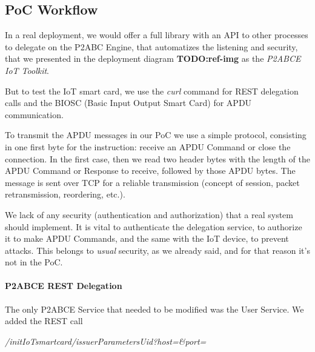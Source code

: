 \subsection{PoC Workflow}





In a real deployment, we would offer a full library with an API to other processes to delegate on the P2ABC Engine, that automatizes the listening and security, that we presented in the deployment diagram \textbf{TODO:ref-img} as the \textit{P2ABCE IoT Toolkit}.

But to test the IoT smart card, we use the \textit{curl} command for REST delegation calls and the BIOSC (Basic Input Output Smart Card) for APDU communication.

To transmit the APDU messages in our PoC we use a simple protocol, consisting in one first byte for the instruction: receive an APDU Command or close the connection. In the first case, then we read two header bytes with the length of the APDU Command or Response to receive, followed by those APDU bytes. The message is sent over TCP for a reliable transmission (concept of session, packet retransmission, reordering, etc.).

We lack of any security (authentication and authorization) that a real system should implement. It is vital to authenticate the delegation service, to authorize it to make APDU Commands, and the same with the IoT device, to prevent attacks. This belongs to \textit{usual} security, as we already said, and for that reason it's not in the PoC.

\paragraph{P2ABCE REST Delegation}


The only P2ABCE Service that needed to be modified was the User Service. We added the REST call

\begin{center}
	\textit{/initIoTsmartcard/{issuerParametersUid}?host=\&port=}
\end{center}

